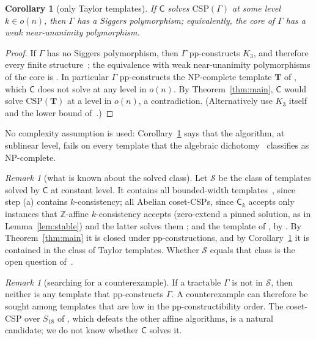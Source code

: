 \documentclass[11pt]{article}
\newtheorem{corollary}[theorem]{Corollary}
\theoremstyle{definition}
\theoremstyle{remark}
\newtheorem{remark}[theorem]{Remark}
\newcommand{\Csp}{\mathrm{CSP}}
\newcommand{\Coh}{\mathsf{C}}
\begin{document}
\begin{corollary}[only Taylor templates]\label{cor:taylor}
If $\Coh$ solves $\Csp(\Gamma)$ at some level $k\in o(n)$, then $\Gamma$ has a
Siggers polymorphism; equivalently, the core of $\Gamma$ has a weak
near-unanimity polymorphism.
\end{corollary}
\begin{proof}
If $\Gamma$ has no Siggers polymorphism, then $\Gamma$ pp-constructs $K_3$,
and therefore every finite structure~\cite{BOP18}; the equivalence with weak
near-unanimity polymorphisms of the core is \cite{MM08,Sig10}. In particular
$\Gamma$ pp-constructs the NP-complete template $\mathbf T$ of
\cite[Theorem~1.3]{LP25}, which $\Coh$ does not solve at any level in $o(n)$.
By Theorem~\ref{thm:main}, $\Coh$ would solve $\Csp(\mathbf T)$ at a level in
$o(n)$, a contradiction. (Alternatively use $K_3$ itself and the lower bound
of~\cite{CGP26}.)
\end{proof}

No complexity assumption is used: Corollary~\ref{cor:taylor} says that the
algorithm, at sublinear level, fails on every template that the algebraic
dichotomy~\cite{Bul17,Zhu20} classifies as NP-complete.

\begin{remark}[what is known about the solved class]
Let $\mathcal S$ be the class of templates solved by $\Coh$ at constant level.
It contains all bounded-width templates~\cite{BK14}, since step (a) contains
$k$-consistency; all Abelian coset-CSPs, since $\Coh_k$ accepts only
instances that $\mathbb Z$-affine $k$-consistency accepts (zero-extend a
pinned solution, as in Lemma~\ref{lem:stable}) and the latter solves them
\cite[Theorem~1.2(1)]{LP25}; and the template of
\cite[Theorem~1.1]{LP25}, by \cite[Theorem~1.3]{LP25}. By Theorem~\ref{thm:main} it is closed under
pp-constructions, and by Corollary~\ref{cor:taylor} it is contained in the
class of Taylor templates. Whether $\mathcal S$ equals that class is the open
question of~\cite{LP25}.
\end{remark}

\begin{remark}[searching for a counterexample]
If a tractable $\Gamma$ is not in $\mathcal S$, then neither is any template
that pp-constructs $\Gamma$. A counterexample can therefore be sought among
templates that are low in the pp-constructibility order. The coset-CSP over
$S_{18}$ of \cite[Theorem~1.2]{LP25}, which defeats the other affine
algorithms, is a natural candidate; we do not know whether $\Coh$ solves it.
\end{remark}
\end{document}
